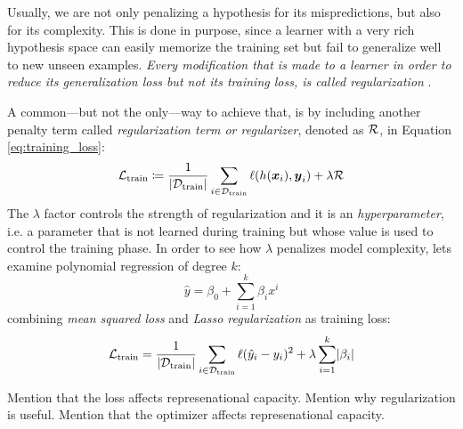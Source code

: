 Usually, we are not only penalizing a hypothesis for its mispredictions, but
also for its complexity. This is done in purpose, since a learner with a very
rich hypothesis space can easily memorize the training set but fail to
generalize well to new unseen examples. \emph{Every modification that is made to
a learner in order to reduce its generalization loss but not its training loss,
is called regularization} \parencite{deeplearning}.

A common---but not the only---way to achieve that, is by including another
penalty term called \emph{regularization term or
regularizer}, denoted as $\mathcal{R}$, in Equation
\ref{eq:training_loss}:
\begin{equation}
	\label{eq:regularization}
	\mathcal{L}_\text{train} \coloneqq \frac{1}{\lvert \mathcal{D}_\text{train} \rvert} \sum_{i \in \mathcal{D}_\text{train}}
	\ell(h(\boldsymbol{x}_i), \boldsymbol{y}_i)
	+
	\lambda \mathcal{R}
\end{equation}
The $\lambda$ factor controls the strength of regularization and it is an
\emph{hyperparameter}, i.e. a parameter that is not
learned during training but whose value is used to control the training phase.
In order to see how $\lambda$ penalizes model complexity, lets examine
polynomial regression of degree $k$:
\begin{equation}
	\hat{y} = \beta_0 + \sum_{i=1}^k \beta_i x^i
\end{equation}
combining \emph{mean squared loss} and
\emph{Lasso regularization} as training loss:
\begin{equation}
	\label{eq:lasso}
	\mathcal{L}_\text{train} = \frac{1}{\lvert \mathcal{D}_\text{train} \rvert} \sum_{i \in \mathcal{D}_\text{train}}
	\ell(\hat{y}_i - y_i)^2
	+
	\lambda \sum_{i=1}^k \lvert \beta_i \rvert
\end{equation}

\begin{definition}[Optimizer]
\end{definition}

Mention that the loss affects represenational capacity.
Mention why regularization is useful.
Mention that the optimizer affects represenational capacity.

